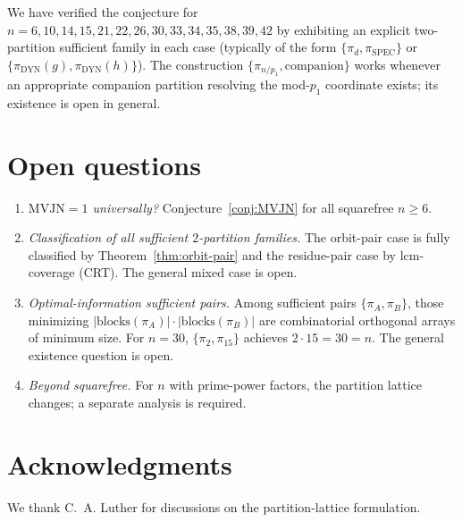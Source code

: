 \documentclass[11pt,reqno]{amsart}
\theoremstyle{plain}
\theoremstyle{definition}
\newcommand{\DYN}{\mathrm{DYN}}
\newcommand{\SPEC}{\mathrm{SPEC}}
\newcommand{\lcm}{\mathrm{lcm}}
\begin{document}
We have verified the conjecture for $n = 6, 10, 14, 15, 21, 22, 26, 30, 33, 34, 35, 38, 39, 42$ by exhibiting an explicit two-partition sufficient family in each case (typically of the form $\{\pi_d, \pi_{\SPEC}\}$ or $\{\pi_{\DYN}(g), \pi_{\DYN}(h)\}$). The construction $\{\pi_{n/p_1}, \text{companion}\}$ works whenever an appropriate companion partition resolving the mod-$p_1$ coordinate exists; its existence is open in general.

\section{Open questions}

\begin{enumerate}[label=(\alph*)]
\item \emph{$\mathrm{MVJN} = 1$ universally?} Conjecture~\ref{conj:MVJN} for all squarefree $n \geq 6$.
\item \emph{Classification of all sufficient $2$-partition families.} The orbit-pair case is fully classified by Theorem~\ref{thm:orbit-pair} and the residue-pair case by $\lcm$-coverage (CRT). The general mixed case is open.
\item \emph{Optimal-information sufficient pairs.} Among sufficient pairs $\{\pi_A, \pi_B\}$, those minimizing $|\mathrm{blocks}(\pi_A)| \cdot |\mathrm{blocks}(\pi_B)|$ are combinatorial orthogonal arrays of minimum size. For $n = 30$, $\{\pi_2, \pi_{15}\}$ achieves $2 \cdot 15 = 30 = n$. The general existence question is open.
\item \emph{Beyond squarefree.} For $n$ with prime-power factors, the partition lattice changes; a separate analysis is required.
\end{enumerate}

\section*{Acknowledgments}

We thank C.~A. Luther for discussions on the partition-lattice formulation.
\end{document}
